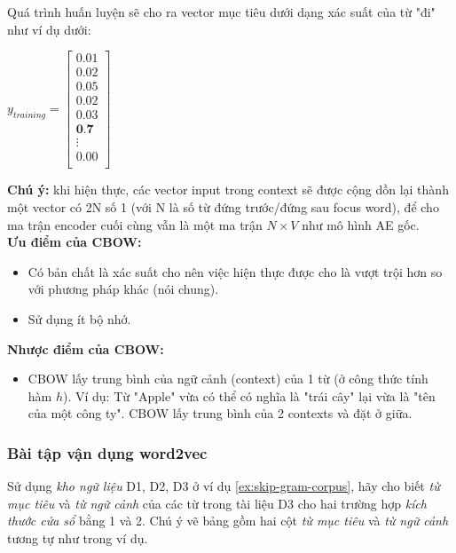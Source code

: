 Quá trình huấn luyện sẽ cho ra vector mục tiêu dưới dạng xác suất của từ "đi" như ví dụ dưới:
\begin{center}
    $y_{training} =
    \begin{bmatrix}
        0.01 \\
        0.02 \\
        0.05 \\
        0.02 \\
        0.03 \\
        \textbf{0.7} \\
        \vdots \\
        0.00 \\
    \end{bmatrix}
    $
\end{center}

\textbf{Chú ý: } khi hiện thực, các vector input trong context sẽ được cộng dồn lại thành một vector có 2N số 1 (với N là số từ đứng trước/đứng sau focus word), để cho ma trận encoder cuối cùng vẫn là một ma trận $N\times V$ như mô hình AE gốc.\\

\textbf{Ưu điểm của CBOW:}
\begin{itemize}
  \item Có bản chất là xác suất cho nên việc hiện thực được cho là vượt trội hơn so với phương pháp khác (nói chung).
  \item Sử dụng ít bộ nhớ.
\end{itemize}

\textbf{Nhược điểm của CBOW:}
\begin{itemize}
  \item CBOW lấy trung bình của ngữ cảnh (context) của 1 từ (ở công thức tính hàm $h$). Ví dụ: Từ "Apple" vừa có thể có nghĩa là "trái cây" lại vừa là "tên của một công ty". CBOW lấy trung bình của 2 contexts và đặt ở giữa.
\end{itemize}

\subsubsection{Bài tập vận dụng word2vec}
\begin{exer}
Sử dụng \textit{kho ngữ liệu} D1, D2, D3 ở ví dụ \ref{ex:skip-gram-corpus}, hãy cho biết \textit{từ mục tiêu} và \textit{từ ngữ cảnh} của các từ trong tài liệu D3 cho hai trường hợp \textit{kích thước cửa sổ} bằng 1 và 2. Chú ý vẽ bảng gồm hai cột \textit{từ mục tiêu} và \textit{từ ngữ cảnh} tương tự như trong ví dụ.
\end{exer}

